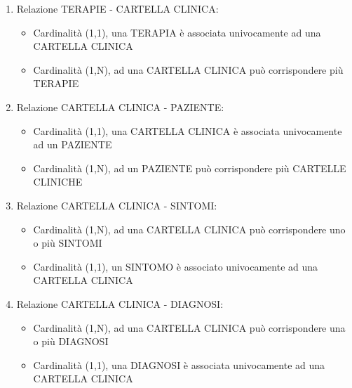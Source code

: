 \documentclass[a4paper,titlepage]{article}
\begin{document}
\begin{enumerate}

\item Relazione TERAPIE - CARTELLA CLINICA:

\begin{itemize}[leftmargin=0.5cm, topsep=0.5cm, itemsep=0.2cm]

\item Cardinalità (1,1), una TERAPIA è associata univocamente ad una CARTELLA CLINICA
\item Cardinalità (1,N), ad una CARTELLA CLINICA può corrispondere più TERAPIE

\end{itemize}

\item Relazione CARTELLA CLINICA - PAZIENTE:

\begin{itemize}[leftmargin=0.5cm, topsep=0.5cm, itemsep=0.2cm]

\item Cardinalità (1,1), una CARTELLA CLINICA è associata univocamente ad un PAZIENTE
\item Cardinalità (1,N), ad un PAZIENTE può corrispondere più CARTELLE CLINICHE

\end{itemize}

\item Relazione CARTELLA CLINICA - SINTOMI:

\begin{itemize}[leftmargin=0.5cm, topsep=0.5cm, itemsep=0.2cm]

\item Cardinalità (1,N), ad una CARTELLA CLINICA può corrispondere uno o più SINTOMI
\item Cardinalità (1,1), un SINTOMO è associato univocamente ad una CARTELLA CLINICA

\end{itemize}

\item Relazione CARTELLA CLINICA - DIAGNOSI:

\begin{itemize}[leftmargin=0.5cm, topsep=0.5cm, itemsep=0.2cm]

\item Cardinalità (1,N), ad una CARTELLA CLINICA può corrispondere una o più DIAGNOSI
\item Cardinalità (1,1), una DIAGNOSI è associata univocamente ad una CARTELLA CLINICA


\end{itemize}
\end{enumerate}
\end{document}
